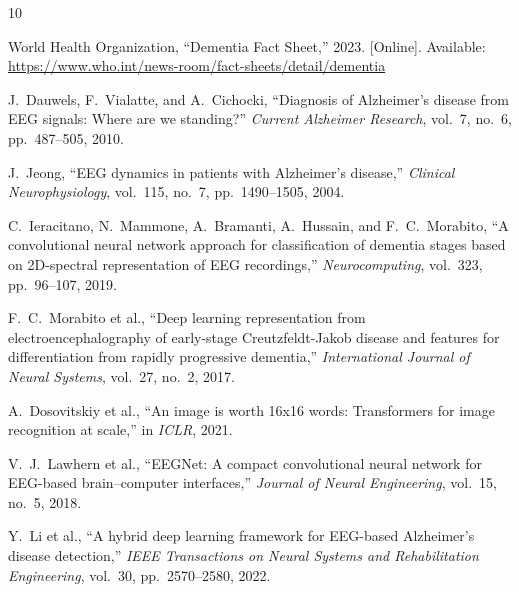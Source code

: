 \documentclass[twocolumn,11pt]{article}
\begin{document}
\begin{thebibliography}{10}

World Health Organization, ``Dementia Fact Sheet,'' 2023. [Online]. Available: \url{https://www.who.int/news-room/fact-sheets/detail/dementia}

J.~Dauwels, F.~Vialatte, and A.~Cichocki, ``Diagnosis of Alzheimer's disease from EEG signals: Where are we standing?'' \textit{Current Alzheimer Research}, vol.~7, no.~6, pp.~487--505, 2010.

J.~Jeong, ``EEG dynamics in patients with Alzheimer's disease,'' \textit{Clinical Neurophysiology}, vol.~115, no.~7, pp.~1490--1505, 2004.

C.~Ieracitano, N.~Mammone, A.~Bramanti, A.~Hussain, and F.~C.~Morabito, ``A convolutional neural network approach for classification of dementia stages based on 2D-spectral representation of EEG recordings,'' \textit{Neurocomputing}, vol.~323, pp.~96--107, 2019.

F.~C.~Morabito et al., ``Deep learning representation from electroencephalography of early-stage Creutzfeldt-Jakob disease and features for differentiation from rapidly progressive dementia,'' \textit{International Journal of Neural Systems}, vol.~27, no.~2, 2017.

A.~Dosovitskiy et al., ``An image is worth 16x16 words: Transformers for image recognition at scale,'' in \textit{ICLR}, 2021.

V.~J.~Lawhern et al., ``EEGNet: A compact convolutional neural network for EEG-based brain--computer interfaces,'' \textit{Journal of Neural Engineering}, vol.~15, no.~5, 2018.

Y.~Li et al., ``A hybrid deep learning framework for EEG-based Alzheimer's disease detection,'' \textit{IEEE Transactions on Neural Systems and Rehabilitation Engineering}, vol.~30, pp.~2570--2580, 2022.

\end{thebibliography}
\end{document}
